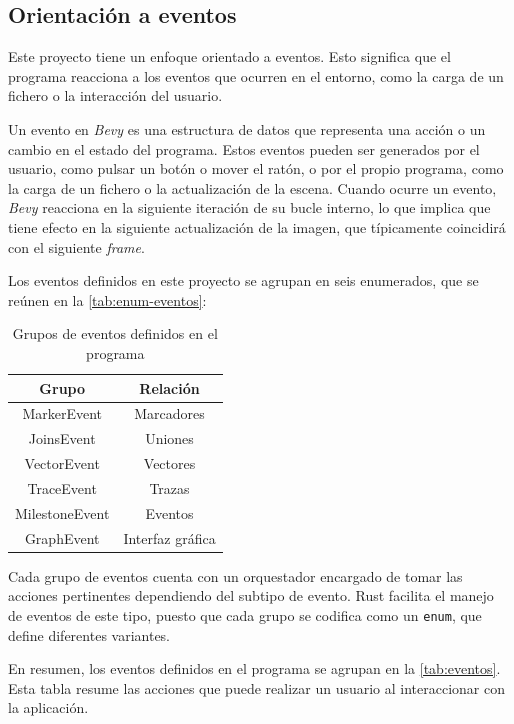 \subsection{Orientación a eventos} \label{sec:bevy-eventos}

Este proyecto tiene un enfoque orientado a eventos. Esto significa que el programa reacciona a los eventos que ocurren en el entorno, como la carga de un fichero o la interacción del usuario. 

Un evento en \textit{Bevy} es una estructura de datos que representa una acción o un cambio en el estado del programa. Estos eventos pueden ser generados por el usuario, como pulsar un botón o mover el ratón, o por el propio programa, como la carga de un fichero o la actualización de la escena. Cuando ocurre un evento, \textit{Bevy} reacciona en la siguiente iteración de su bucle interno, lo que implica que tiene efecto en la siguiente actualización de la imagen, que típicamente coincidirá con el siguiente \textit{frame}.

Los eventos definidos en este proyecto se agrupan en seis enumerados, que se reúnen en la \autoref{tab:enum-eventos}:

\begin{table}[H]
  \centering
  \begin{tabular}{c|c}
  \toprule
  {\textbf{Grupo}} & {\textbf{Relación}} \\
  \midrule
  MarkerEvent & Marcadores \\
  JoinsEvent & Uniones \\
  VectorEvent & Vectores \\
  TraceEvent & Trazas \\
  MilestoneEvent & Eventos \\
  GraphEvent & Interfaz gráfica \\
  \bottomrule
  \end{tabular}
  \caption{Grupos de eventos definidos en el programa}
  \label{tab:enum-eventos}
\end{table}

Cada grupo de eventos cuenta con un orquestador encargado de tomar las acciones pertinentes dependiendo del subtipo de evento. Rust facilita el manejo de eventos de este tipo, puesto que cada grupo se codifica como un \texttt{enum}, que define diferentes variantes.

En resumen, los eventos definidos en el programa se agrupan en la \autoref{tab:eventos}. Esta tabla resume las acciones que puede realizar un usuario al interaccionar con la aplicación.

